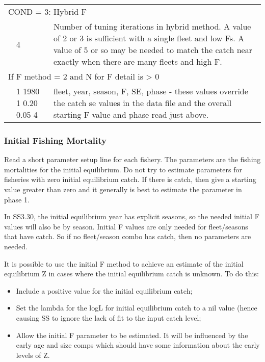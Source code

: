 \begin{center}
\begin{longtable}{p{1cm} p{3cm} p{11.3cm}}
		   \multicolumn{3}{l}{COND = 3: Hybrid F}\\
		   & 4 & Number of tuning iterations in hybrid method. A value of 2 or 3 is sufficient with a single fleet and low Fs.  A value of 5 or so may be needed to match the catch near exactly when there are many fleets and high F. \\
		   \hline
		   \multicolumn{3}{l}{If F method = 2 and N for F detail is > 0}\\
		   & 1 1980 1 0.20 0.05 4 & fleet, year, season, F, SE, phase - these values override the catch se values in the data file and the overall starting F value and phase read just above.\\
		   \hline
	\end{longtable}
\end{center}

\subsubsection{Initial Fishing Mortality}
Read a short parameter setup line for each fishery.  The parameters are the fishing mortalities for the initial equilibrium.  Do not try to estimate parameters for fisheries with zero initial equilibrium catch.  If there is catch, then give a starting value greater than zero and it generally is best to estimate the parameter in phase 1.

In SS3.30, the initial equilibrium year has explicit seasons, so the needed initial F values will also be by season.  Initial F values are only needed for fleet/seasons that have catch.  So if no fleet/season combo has catch, then no parameters are needed.

It is possible to use the initial F method to achieve an estimate of the initial equilibrium Z in cases where the initial equilibrium catch is unknown.  To do this:
\begin{itemize}
	\item Include a positive value for the initial equilibrium catch;
	\item Set the lambda for the logL for initial equilibrium catch to a nil value (hence causing SS to ignore the lack of fit to the input catch level;
	\item Allow the initial F parameter to be estimated.  It will be influenced by the early age and size comps which should have some information about the early levels of Z.
\end{itemize}

\hypertarget{Qsetup}{}
